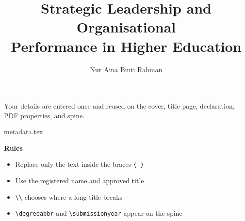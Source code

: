 \documentclass[11pt,a4paper]{article}
\newcommand\cmd[1]{\texttt{\textbackslash #1}}
\newenvironment{igitems}
  {\begin{itemize}[leftmargin=1.1em,itemsep=2pt,topsep=0pt,parsep=0pt,
     label={\color{iucpurple}\scriptsize$\blacktriangleright$}]}
  {\end{itemize}}
\begin{document}
Your details are entered once and reused on the cover, title page, declaration,
PDF properties, and spine.

\begin{tcbraster}[raster columns=2,raster column skip=8pt,raster equal height]
\begin{codecard}{metadata.tex}
\title{Strategic Leadership and
  Organisational\\ Performance in
  Higher Education}
\author{Nur Aina Binti Rahman}
\address{Kuala Lumpur, Malaysia}
\end{codecard}
\begin{tcolorbox}[igtile,colback=white,colframe=iucpurple!25]
  {\color{iucpurple}\bfseries Rules}\par\vspace{3pt}
  \begin{igitems}
    \item Replace only the text inside the braces \texttt{\{ \}}
    \item Use the registered name and approved title
    \item \texttt{\textbackslash\textbackslash} chooses where a long title breaks
    \item \cmd{degreeabbr} and \cmd{submissionyear} appear on the spine
  \end{igitems}
  \par\vspace{3pt}
\end{tcolorbox}
\end{tcbraster}
\end{document}
